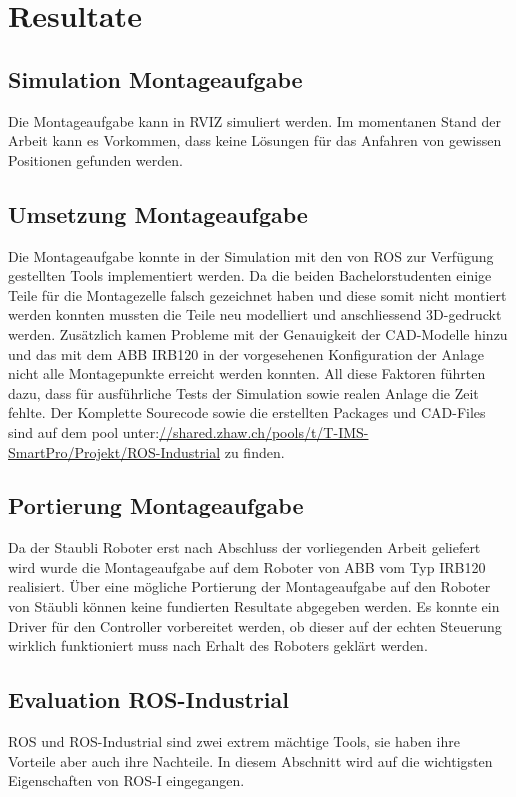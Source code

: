 \chapter{Resultate}
\label{sec:Resultate}
\section{Simulation Montageaufgabe}
Die Montageaufgabe kann in RVIZ simuliert werden. Im momentanen Stand der Arbeit kann es Vorkommen, dass keine Lösungen für das Anfahren von gewissen Positionen gefunden werden.

\section{Umsetzung Montageaufgabe}
Die Montageaufgabe konnte in der Simulation mit den von ROS zur Verfügung gestellten Tools implementiert werden. Da die beiden Bachelorstudenten einige Teile für die Montagezelle falsch gezeichnet haben und diese somit nicht montiert werden konnten mussten die Teile neu modelliert und anschliessend 3D-gedruckt werden. Zusätzlich kamen Probleme mit der Genauigkeit der CAD-Modelle hinzu und das mit dem ABB IRB120 in der vorgesehenen Konfiguration der Anlage nicht alle Montagepunkte erreicht werden konnten. All diese Faktoren führten dazu, dass für ausführliche Tests der Simulation sowie realen Anlage die Zeit fehlte.
Der Komplette Sourecode sowie die erstellten Packages und CAD-Files sind auf dem pool unter:\url{//shared.zhaw.ch/pools/t/T-IMS-SmartPro/Projekt/ROS-Industrial} zu finden.
\section{Portierung Montageaufgabe}
Da der Staubli Roboter erst nach Abschluss der vorliegenden Arbeit geliefert wird wurde die Montageaufgabe auf dem Roboter von ABB vom Typ IRB120 realisiert. Über eine mögliche Portierung der Montageaufgabe auf den Roboter von Stäubli können keine fundierten Resultate abgegeben werden. Es konnte ein Driver für den Controller vorbereitet werden, ob dieser auf der echten Steuerung wirklich funktioniert muss nach Erhalt des Roboters geklärt werden.

\section{Evaluation ROS-Industrial}
ROS und ROS-Industrial sind zwei extrem mächtige Tools, sie haben ihre Vorteile aber auch ihre Nachteile. In diesem Abschnitt wird auf die wichtigsten Eigenschaften von ROS-I eingegangen. 
